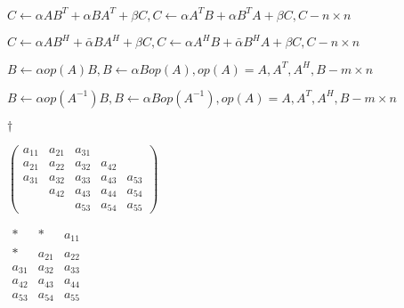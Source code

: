 {\newpage\clearpage
{}%
$ C \leftarrow \alpha AB ^{T} + \alpha BA ^{T} + \beta C, C \leftarrow \alpha A ^{T} B + \alpha B ^{T} A + \beta C, C - n \times n $%
\lthtmlinlinemathZ
\lthtmlcheckvsize\clearpage}

{\newpage\clearpage
{}%
$ C \leftarrow \alpha AB ^{H} + \bar{\alpha} BA ^{H} + \beta C, C \leftarrow \alpha A ^{H} B + \bar{\alpha} B ^{H} A + \beta C, C - n \times n $%
\lthtmlinlinemathZ
\lthtmlcheckvsize\clearpage}

{\newpage\clearpage
{}%
$ B \leftarrow \alpha op(A)B, B \leftarrow \alpha B op(A), op(A) = A, A ^{T}, A ^{H}, B - m \times n $%
\lthtmlinlinemathZ
\lthtmlcheckvsize\clearpage}

{\newpage\clearpage
{}%
$ B \leftarrow \alpha op(A ^{-1} )B, B \leftarrow \alpha B op(A ^{-1} ), op(A) = A, A ^{T}, A ^{H}, B - m \times n $%
\lthtmlinlinemathZ
\lthtmlcheckvsize\clearpage}


\setlength{\textwidth}{4.0in}%

\setlength{\textwidth}{4.0in}
{\newpage\clearpage
{}%
$\dag $%
\lthtmlinlinemathZ
\lthtmlcheckvsize\clearpage}

{\newpage\clearpage
{}%
$
\left( \begin{array}{ccccc}
a_{11} & a_{21} & a_{31} &              &              \\
a_{21} & a_{22}       & a_{32} & a_{42} &              \\
a_{31} & a_{32}       & a_{33}       & a_{43} & a_{53} \\
       & a_{42}       & a_{43}       & a_{44}       & a_{54} \\
       &              & a_{53}       & a_{54}       & a_{55}
\end{array} \right)
$%
\lthtmlinlinemathZ
\lthtmlcheckvsize\clearpage}

{\newpage\clearpage
{}%
$
\begin{array}{ccccc}
 \ast  &  \ast  & a_{11} \\
 \ast  & a_{21} & a_{22} \\
a_{31} & a_{32} & a_{33} \\
a_{42} & a_{43} & a_{44} \\
a_{53} & a_{54} & a_{55} 
\end{array}
$%
\lthtmlinlinemathZ
\lthtmlcheckvsize\clearpage}

